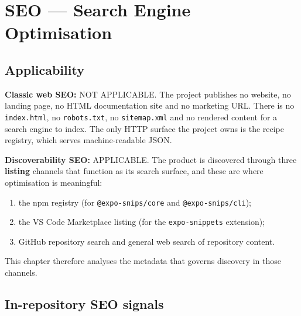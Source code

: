 \chapter{SEO --- Search Engine Optimisation}
\label{ch:seo}

\section{Applicability}

\textbf{Classic web SEO:} NOT APPLICABLE. The project publishes no website, no
landing page, no HTML documentation site and no marketing URL. There is no
\texttt{index.html}, no \texttt{robots.txt}, no \texttt{sitemap.xml} and no
rendered content for a search engine to index. The only HTTP surface the project
owns is the recipe registry, which serves machine-readable JSON.

\textbf{Discoverability SEO:} APPLICABLE. The product is discovered through three
\textbf{listing} channels that function as its search surface, and these are
where optimisation is meaningful:

\begin{enumerate}
  \item the npm registry (for \texttt{@expo-snips/core} and
        \texttt{@expo-snips/cli});
  \item the VS Code Marketplace listing (for the \texttt{expo-snippets}
        extension);
  \item GitHub repository search and general web search of repository content.
\end{enumerate}

This chapter therefore analyses the metadata that governs discovery in those
channels.

\section{In-repository SEO signals}

